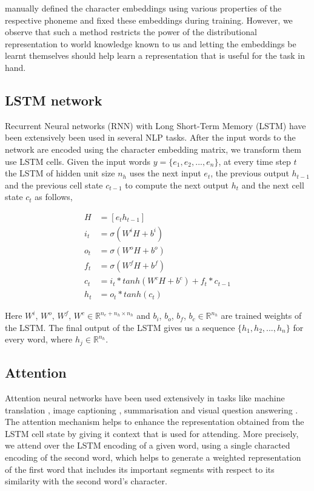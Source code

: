 \documentclass[11pt,letterpaper]{article}
\begin{document}
\citet{rama2016siamese} manually defined the character embeddings using various properties of the respective phoneme and fixed these embeddings during training. However, we observe that such a method restricts the power of the distributional representation to world knowledge known to us and letting the embeddings be learnt themselves should help learn a representation that is useful for the task in hand.

\subsection{LSTM network}

Recurrent Neural networks (RNN) with Long Short-Term Memory (LSTM) have been extensively been used in several NLP tasks. After the input words to the network are encoded using the character embedding matrix, we transform them use LSTM cells. Given the input words $y = \{e_1, e_2, ..., e_n\}$, at every time step $t$ the LSTM of hidden unit size $n_h$ uses the next input $e_t$, the previous output $h_{t-1}$ and the previous cell state $c_{t-1}$ to compute the next output $h_t$ and the next cell state $c_t$ as follows,

\begin{align}
H &= [e_t h_{t-1}] \\
i_t &= \sigma (W^iH + b^i) \\
o_t &= \sigma (W^oH + b^o) \\
f_t &= \sigma (W^fH + b^f) \\
c_t &= i_t * tanh(W^cH + b^c) + f_t * c_{t-1} \\
h_t &= o_t * tanh(c_t)
\end{align}

Here $W^i$, $W^o$, $W^f$, $W^c \in  \mathbb{R}^{n_e+n_h \times n_h}$ and $b_i$, $b_o$, $b_f$, $b_c \in \mathbb{R}^{n_h}$ are trained weights of the LSTM. The final output of the LSTM gives us a sequence $\{h_1, h_2, ..., h_n\}$ for every word, where $h_j \in \mathbb{R}^{n_h}$.

\subsection{Attention}

Attention neural networks have been used extensively in tasks like machine translation \cite{}, image captioning \cite{}, summarisation \cite{} and visual question answering \cite{}. The attention mechanism helps to enhance the representation obtained from the LSTM cell state by giving it context that is used for attending. More precisely, we attend over the LSTM encoding of a given word, using a single characted encoding of the second word, which helps to generate a weighted representation of the first word that includes its important segments with respect to its similarity with the second word's character. 
\end{document}
